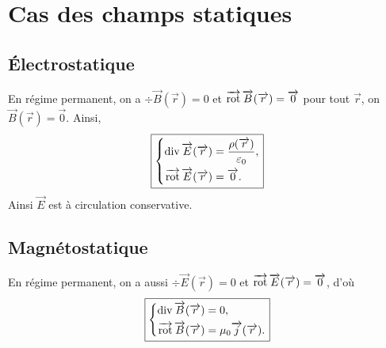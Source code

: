 \section{Cas des champs statiques}
\subsection{Électrostatique}

En régime permanent, on a $\div\vec{B}(\vec{r})=0$ et $\vecrot\vec{B}(\vec{r})=\vec{0}$ pour tout $\vec{r}$, on $\vec{B}(\vec{r})=\vec{0}$. Ainsi,
\begin{equation}
    \boxed{
        \left\lbrace
        \begin{aligned}
            \div\vec{E}(\vec{r})&=\frac{\rho(\vec{r})}{\varepsilon_0},\\
            \vecrot\vec{E}(\vec{r})&=\vec{0}.
        \end{aligned}
        \right.
    }
\end{equation}
Ainsi $\vec{E}$ est à circulation conservative.

\subsection{Magnétostatique}

En régime permanent, on a aussi $\div\vec{E}(\vec{r})=0$ et $\vecrot\vec{E}(\vec{r})=\vec{0}$, d'où
\begin{equation}
    \boxed{
        \left\lbrace
        \begin{aligned}
            \div\vec{B}(\vec{r})&=0,\\
            \vecrot\vec{B}(\vec{r})&=\mu_0\vec{j}(\vec{r}).
        \end{aligned}
        \right.
    }
\end{equation}
